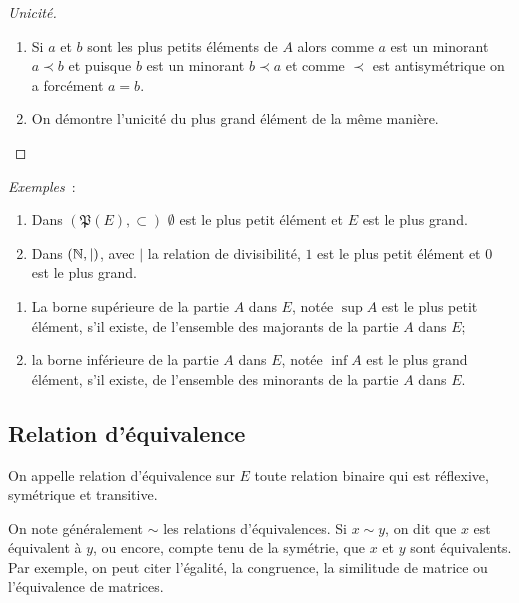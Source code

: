 \begin{proof}[Unicité]
  \begin{enumerate}
    \item Si \(a\) et \(b\) sont les plus petits éléments de \(A\) alors
      comme \(a\) est un minorant \(a \prec b\) et puisque \(b\) est un
      minorant \(b \prec a\) et comme \(\prec\) est antisymétrique on a
      forcément \(a = b\).
    \item On démontre l'unicité du plus grand élément de la même manière.
  \end{enumerate}
\end{proof}

\emph{Exemples}~:
\begin{enumerate}
  \item Dans \((\mathfrak{P}(E), \subset)\) \(\emptyset\) est le plus petit
    élément et \(E\) est le plus grand.
  \item Dans \((\mathbb{N},|)\), avec \(|\) la relation de divisibilité, \(1\) est le
    plus petit élément et \(0\) est le plus grand.
\end{enumerate}

\begin{defdef}
  \begin{enumerate}
    \item La borne supérieure de la partie \(A\) dans \(E\), notée \(\sup
      A\) est le plus petit élément, s'il existe, de l'ensemble des
      majorants de la partie \(A\) dans \(E\);
    \item la borne inférieure de la partie \(A\) dans \(E\), notée \(\inf
      A\) est le plus grand élément, s'il existe, de l'ensemble des
      minorants de la partie \(A\) dans \(E\).
  \end{enumerate}
\end{defdef}

\subsection{Relation d'équivalence}\label{chap3-subsec:relationequivalence}
\begin{defdef}
  On appelle relation d'équivalence sur \(E\) toute relation binaire qui est
  réflexive, symétrique et transitive.
\end{defdef}

On note généralement \(\sim\) les relations d'équivalences. Si \(x \sim y\), on
dit que \(x\) est équivalent à \(y\), ou encore, compte tenu de la symétrie, que
\(x\) et \(y\) sont équivalents. Par exemple, on peut citer l'égalité, la
congruence, la similitude de matrice ou l'équivalence de matrices.

